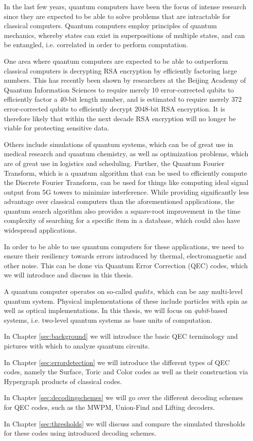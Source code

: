 In the last few years, quantum computers have been the focus of intense research
since they are expected to be able to solve problems that are intractable for
classical computers. 
Quantum computers employ principles of quantum mechanics, whereby states can exist
in superpositions of multiple states, and can be entangled, i.e. correlated
in order to perform computation.

One area where quantum computers are expected to be able to outperform classical
computers is decrypting RSA encryption by efficiently factoring large 
numbers. 
This has recently been shown by researchers at the Beijing
Academy of Quantum Information Sciences to require merely 10 error-corrected
 qubits \cite{beijing} to efficiently factor a 40-bit length number,
and is estimated to require merely 372 error-corrected qubits to efficiently decrypt
2048-bit RSA encryption.
It is therefore likely that within the next decade
RSA encryption will no longer be viable for protecting sensitive data.

Others include simulations of quantum systems, which can be of great use in
medical research and quantum chemistry, as well as optimization problems, which
are of great use in logistics and scheduling.
Further, the Quantum Fourier Transform, which is a quantum algorithm that
can be used to efficiently compute the Discrete Fourier Transform, can be used for 
things like computing ideal signal output from 5G towers to minimize interference.
While providing significantly less advantage over classical computers than the 
aforementioned applications, the quantum search algorithm also provides a 
square-root improvement in the time complexity of searching for a specific item in 
a database, which could also have widespread applications.

In order to be able to use quantum computers for these applications, we need to
ensure their resiliency towards errors introduced by thermal, electromagnetic and 
other noise. 
This can be done via Quantum Error Correction (QEC) codes, which we will introduce
and discuss in this thesis.

A quantum computer operates on so-called $qudits$, which can be
any multi-level quantum system. 
Physical implementations of these include particles with 
spin as well as optical implementations. 
In this thesis, we will
focus on \emph{qubit}-based systems, i.e. two-level quantum systems as base 
units of computation.

In Chapter \ref{sec:background} we will introduce the basic QEC terminology and pictures with which
to analyze quantum circuits.

In Chapter \ref{sec:errordetection} we will introduce the different types of QEC codes, namely the Surface,
Toric and Color codes as well as their construction via Hypergraph products of classical
codes.

In Chapter \ref{sec:decodingschemes} we will go over the different decoding schemes for QEC codes, such as 
the MWPM, Union-Find and Lifting decoders. 

In Chapter \ref{sec:thresholds} we will discuss and compare the simulated thresholds for these codes
using introduced decoding schemes.
